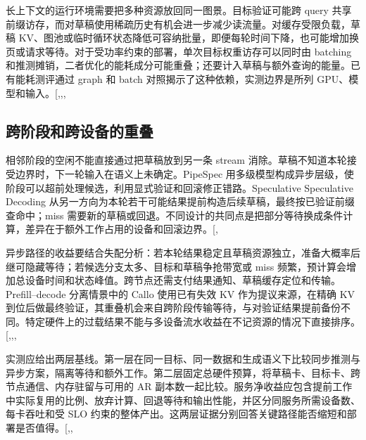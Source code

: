 \documentclass[
  a4paper,
  UTF8,
  fontset=none,
  zihao=5]{ctexart}
\begin{document}
长上下文的运行环境需要把多种资源放回同一图景。目标验证可能跨 query
共享前缀访存，而对草稿使用稀疏历史有机会进一步减少读流量。对缓存受限负载，草稿
KV、图池或临时循环状态降低可容纳批量，即便每轮时间下降，也可能增加换页或请求等待。对于受功率约束的部署，单次目标权重访存可以同时由
batching
和推测摊销，二者优化的能耗成分可能重叠；还要计入草稿与额外查询的能量。已有能耗测评通过
graph 和 batch 对照揭示了这种依赖，实测边界是所列
GPU、模型和输入。{[},,,\citeproc{ref-energy}{74}{]}

\subsection{跨阶段和跨设备的重叠}\label{overlap}

相邻阶段的空闲不能直接通过把草稿放到另一条 stream
消除。草稿不知道本轮接受边界时，下一轮输入在语义上未确定。PipeSpec
用多级模型构成异步层级，使阶段可以超前处理候选，利用显式验证和回滚修正错路。Speculative
Speculative Decoding
从另一方向为本轮若干可能结果提前构造后续草稿，最终按已验证前缀查命中；miss
需要新的草稿或回退。不同设计的共同点是把部分等待换成条件计算，差异在于额外工作占用的设备和回滚边界。{[},\citeproc{ref-ssd}{75}{]}

异步路径的收益要结合失配分析：若本轮结果稳定且草稿资源独立，准备大概率后继可隐藏等待；若候选分支太多、目标和草稿争抢带宽或
miss
频繁，预计算会增加总设备时间和状态峰值。跨节点还需支付结果通知、草稿缓存定位和传输。Prefill--decode
分离情景中的 Callo 使用已有失效 KV 作为提议来源，在精确 KV
到位后做最终验证，其重叠机会来自跨阶段传输等待，与对验证结果提前备份不同。特定硬件上的过载结果不能与多设备流水收益在不记资源的情况下直接排序。{[},,,\citeproc{ref-ssd}{75}{]}

实测应给出两层基线。第一层在同一目标、同一数据和生成语义下比较同步推测与异步方案，隔离等待和额外工作。第二层固定总硬件预算，将草稿卡、目标卡、跨节点通信、内存驻留与可用的
AR
副本数一起比较。服务净收益应包含提前工作中实际复用的比例、放弃计算、回退等待和输出性能，并区分同服务所需设备数、每卡吞吐和受
SLO
约束的整体产出。这两层证据分别回答关键路径能否缩短和部署是否值得。{[},,\citeproc{ref-ssd}{75}{]}
\end{document}
